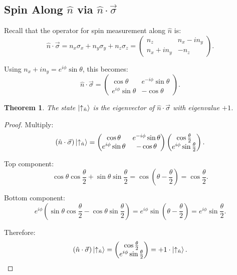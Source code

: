 \documentclass[11pt,a4paper]{article}
\theoremstyle{definition}
\theoremstyle{plain}
\newtheorem{theorem}{Theorem}[section]
\theoremstyle{remark}
\begin{document}
\subsection{Spin Along $\hat{n}$ via $\hat{n}\cdot\vec{\sigma}$}

Recall that the operator for spin measurement along $\hat{n}$ is:
\[
    \hat{n}\cdot\vec{\sigma} = n_x\sigma_x + n_y\sigma_y + n_z\sigma_z = \begin{pmatrix} n_z & n_x - in_y \\ n_x + in_y & -n_z \end{pmatrix}.
\]

Using $n_x + in_y = e^{i\phi}\sin\theta$, this becomes:
\[
    \hat{n}\cdot\vec{\sigma} = \begin{pmatrix} \cos\theta & e^{-i\phi}\sin\theta \\ e^{i\phi}\sin\theta & -\cos\theta \end{pmatrix}.
\]

\begin{theorem}
    The state $\ket{\uparrow_{\hat{n}}}$ is the eigenvector of $\hat{n}\cdot\vec{\sigma}$ with eigenvalue $+1$.
\end{theorem}

\begin{proof}
    Multiply:
    \[
        (\hat{n}\cdot\vec{\sigma})\ket{\uparrow_{\hat{n}}} = \begin{pmatrix} \cos\theta & e^{-i\phi}\sin\theta \\ e^{i\phi}\sin\theta & -\cos\theta \end{pmatrix} \begin{pmatrix} \cos\frac{\theta}{2} \\ e^{i\phi}\sin\frac{\theta}{2} \end{pmatrix}.
    \]

    Top component:
    \[
        \cos\theta\cos\frac{\theta}{2} + \sin\theta\sin\frac{\theta}{2} = \cos\!\left(\theta - \frac{\theta}{2}\right) = \cos\frac{\theta}{2}.
    \]

    Bottom component:
    \[
        e^{i\phi}\!\left(\sin\theta\cos\frac{\theta}{2} - \cos\theta\sin\frac{\theta}{2}\right) = e^{i\phi}\sin\!\left(\theta - \frac{\theta}{2}\right) = e^{i\phi}\sin\frac{\theta}{2}.
    \]

    Therefore:
    \[
        (\hat{n}\cdot\vec{\sigma})\ket{\uparrow_{\hat{n}}} = \begin{pmatrix}\cos\frac{\theta}{2} \\ e^{i\phi}\sin\frac{\theta}{2}\end{pmatrix} = +1 \cdot \ket{\uparrow_{\hat{n}}}. \qedhere
    \]
\end{proof}
\end{document}
